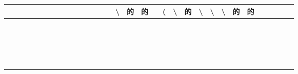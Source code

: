\documentclass[10pt]{article}
\begin{document}
\begin{center}
\begin{tabular}{|c|c|c|c|c|c|c|c|c|c|c|c|c|c|c|c|c|c|c|c|c|c|c|c|c|c|c|c|c|c|c|c|}
\hline
 &  &  &  &  &  &  &  &  &  &  &  &  &  &  & \textbackslash  & 的 & 的 &  & ( & \textbackslash  & 的 & \textbackslash  & \textbackslash  & \textbackslash  & 的 & 的 &  &  &  &  &  \\
\hline
 &  &  &  &  &  &  &  &  &  &  &  &  &  &  &  &  &  &  &  &  &  &  &  &  &  &  &  &  &  &  &  \\
\hline
 &  &  &  &  &  &  &  &  &  &  &  &  &  &  &  &  &  &  &  &  &  &  &  &  &  &  &  &  &  &  &  \\
\hline
 &  &  &  &  &  &  &  &  &  &  &  &  &  &  &  &  &  &  &  &  &  &  &  &  &  &  &  &  &  &  &  \\
\hline
 &  &  &  &  &  &  &  &  &  &  &  &  &  &  &  &  &  &  &  &  &  &  &  &  &  &  &  &  &  &  &  \\
\hline
 &  &  &  &  &  &  &  &  &  &  &  &  &  &  &  &  &  &  &  &  &  &  &  &  &  &  &  &  &  &  &  \\
\hline
 &  &  &  &  &  &  &  &  &  &  &  &  &  &  &  &  &  &  &  &  &  &  &  &  &  &  &  &  &  &  &  \\
\hline
 &  &  &  &  &  &  &  &  &  &  &  &  &  &  &  &  &  &  &  &  &  &  &  &  &  &  &  &  &  &  &  \\
\hline
 &  &  &  &  &  &  &  &  &  &  &  &  &  &  &  &  &  &  &  &  &  &  &  &  &  &  &  &  &  &  &  \\
\hline
 &  &  &  &  &  &  &  &  &  &  &  &  &  &  &  &  &  &  &  &  &  &  &  &  &  &  &  &  &  &  &  \\
\hline
 &  &  &  &  &  &  &  &  &  &  &  &  &  &  &  &  &  &  &  &  &  &  &  &  &  &  &  &  &  &  &  \\
\hline
 &  &  &  &  &  &  &  &  &  &  &  &  &  &  &  &  &  &  &  &  &  &  &  &  &  &  &  &  &  &  &  \\
\hline
 &  &  &  &  &  &  &  &  &  &  &  &  &  &  &  &  &  &  &  &  &  &  &  &  &  &  &  &  &  &  &  \\
\hline
 &  &  &  &  &  &  &  &  &  &  &  &  &  &  &  &  &  &  &  &  &  &  &  &  &  &  &  &  &  &  &  \\
\hline
 &  &  &  &  &  &  &  &  &  &  &  &  &  &  &  &  &  &  &  &  &  &  &  &  &  &  &  &  &  &  &  \\
\hline
 &  &  &  &  &  &  &  &  &  &  &  &  &  &  &  &  &  &  &  &  &  &  &  &  &  &  &  &  &  &  &  \\
\hline
 &  &  &  &  &  &  &  &  &  &  &  &  &  &  &  &  &  &  &  &  &  &  &  &  &  &  &  &  &  &  &  \\
\hline
 &  &  &  &  &  &  &  &  &  &  &  &  &  &  &  &  &  &  &  &  &  &  &  &  &  &  &  &  &  &  &  \\
\hline
 &  &  &  &  &  &  &  &  &  &  &  &  &  &  &  &  &  &  &  &  &  &  &  &  &  &  &  &  &  &  &  \\
\hline
 &  &  &  &  &  &  &  &  &  &  &  &  &  &  &  &  &  &  &  &  &  &  &  &  &  &  &  &  &  &  &  \\
\hline
\end{tabular}
\end{center}
\end{document}
